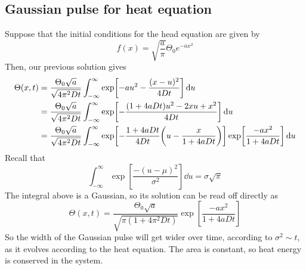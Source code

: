 \subsection{Gaussian pulse for heat equation}
Suppose that the initial conditions for the head equation are given by
\[
	f(x) = \sqrt{\frac{a}{\pi}} \Theta_0 e^{-ax^2}
\]
Then, our previous solution gives
\begin{align*}
	\Theta(x,t) & = \frac{\Theta_0 \sqrt{a}}{\sqrt{4 \pi^2 D t}} \int_{-\infty}^\infty \exp[-au^2 - \frac{(x-u)^2}{4 D t}] \dd{u}                                                      \\
	            & = \frac{\Theta_0 \sqrt{a}}{\sqrt{4 \pi^2 D t}} \int_{-\infty}^\infty \exp[-\frac{(1 + 4 a D t)u^2 - 2xu + x^2}{4 D t}] \dd{u}                                        \\
	            & = \frac{\Theta_0 \sqrt{a}}{\sqrt{4 \pi^2 D t}} \int_{-\infty}^\infty \exp[-\frac{1 + 4 a D t}{4 D t} \qty(u - \frac{x}{1+4aDt}) ] \exp[ \frac{-ax^2}{1+4aDt}] \dd{u}
\end{align*}
Recall that
\[
	\int_{-\infty}^\infty \exp[\frac{-(u - \mu)^2}{\sigma^2}] \dd{u} = \sigma \sqrt{\pi}
\]
The integral above is a Gaussian, so its solution can be read off directly as
\[
	\Theta(x,t) = \frac{\Theta_0 \sqrt{a}}{\sqrt{\pi (1 + 4 \pi^2 D t)}} \exp[\frac{-ax^2}{1+4aDt}]
\]
So the width of the Gaussian pulse will get wider over time, according to \( \sigma^2 \sim t \), as it evolves according to the heat equation.
The area is constant, so heat energy is conserved in the system.

